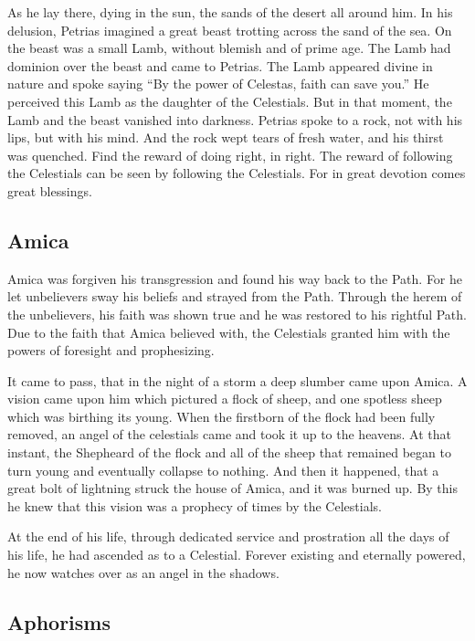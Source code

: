 As he lay there, dying in the sun, the sands of the desert all around him. In his delusion, Petrias imagined a great beast trotting across the sand of the sea. On the beast was a small Lamb, without blemish and of prime age. The Lamb had dominion over the beast and came to Petrias. The Lamb appeared divine in nature and spoke saying “By the power of Celestas, faith can save you.” He perceived this Lamb as the daughter of the Celestials. But in that moment, the Lamb and the beast vanished into darkness. Petrias spoke to a rock, not with his lips, but with his mind. And the rock wept tears of fresh water, and his thirst was quenched. Find the reward of doing right, in right. The reward of following the Celestials can be seen by following the Celestials. For in great devotion comes great blessings.

\subsection{Amica}

Amica was forgiven his transgression and found his way back to the Path. For he let unbelievers sway his beliefs and strayed from the Path. Through the herem of the unbelievers, his faith was shown true and he was restored to his rightful Path. Due to the faith that Amica believed with, the Celestials granted him with the powers of foresight and prophesizing.

It came to pass, that in the night of a storm a deep slumber came upon Amica. A vision came upon him which pictured a flock of sheep, and one spotless sheep which was birthing its young. When the firstborn of the flock had been fully removed, an angel of the celestials came and took it up to the heavens. At that instant, the Shepheard of the flock and all of the sheep that remained began to turn young and eventually collapse to nothing. And then it happened, that a great bolt of lightning struck the house of Amica, and it was burned up. By this he knew that this vision was a prophecy of times by the Celestials.
   
At the end of his life, through dedicated service and prostration all the days of his life, he had ascended as to a Celestial. Forever existing and eternally powered, he now watches over as an angel in the shadows.

\subsection{Aphorisms}

